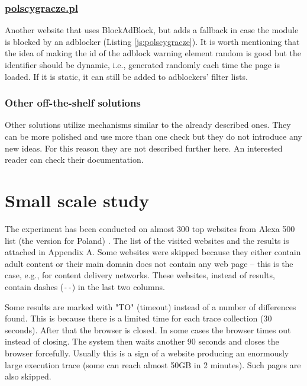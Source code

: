 \subsubsection{\url{polscygracze.pl}}
Another website that uses BlockAdBlock, but adds a fallback in case the module is blocked
by an adblocker (Listing \ref{js:polscygracze}). It is worth mentioning that the idea of 
making the id of the adblock warning element random is good but the identifier should be dynamic,
i.e., generated randomly each time the page is loaded.
If it is static, it can still be added to adblockers' filter lists.
                       


\subsubsection{Other off-the-shelf solutions}
Other solutions utilize mechanisms similar to the already described ones.
They can be more polished and use more than one check
but they do not introduce any new ideas. For this reason they are not described further here.
An interested reader can check their documentation.


\section{Small scale study}

The experiment has been conducted on almost 300 top websites from Alexa 500 list (the version for Poland) \cite{alexa-list}.
The list of the visited websites and the results is attached in Appendix A. Some websites were skipped because they
either contain adult content or their main domain does not contain any web page 
-- this is the case, e.g., for content delivery networks.
These websites, instead of results, contain dashes (\texttt{-{}-}) in the last two columns.

Some results are marked with "TO" (timeout) instead of a number of differences found. This is because
there is a limited time for each trace collection (30 seconds). After that the browser is closed.
In some cases the browser times out instead of closing. The system then waits another 90 seconds and closes
the browser forcefully.
Usually this is a sign of a website producing an enormously large execution trace
(some can reach almost 50GB in 2 minutes). Such pages are also skipped.

